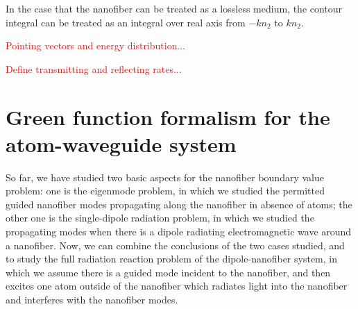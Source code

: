 
In the case that the nanofiber can be treated as a lossless medium, the contour integral can be treated as an integral over real axis from $ -kn_2 $ to $ kn_2 $. 









\textcolor{red}{Pointing vectors and energy distribution...}

\textcolor{red}{Define transmitting and reflecting rates...}





\section{Green function formalism for the atom-waveguide system}
So far, we have studied two basic aspects for the nanofiber boundary value problem: one is the eigenmode problem, in which we studied the permitted guided nanofiber modes propagating along the nanofiber in absence of atoms; the other one is the single-dipole radiation problem, in which we studied the propagating modes when there is a dipole radiating electromagnetic wave around a nanofiber. Now, we can combine the conclusions of the two cases studied, and to study the full radiation reaction problem of the dipole-nanofiber system, in which we assume there is a guided mode incident to the nanofiber, and then excites one atom outside of the nanofiber which radiates light into the nanofiber and interferes with the nanofiber modes. 


